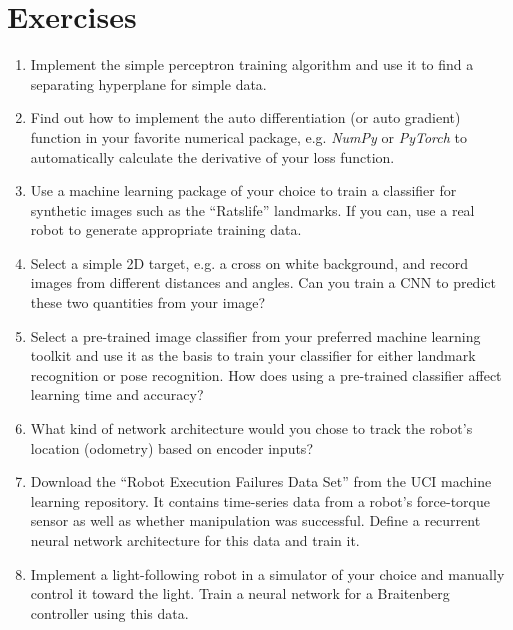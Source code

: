 \section*{Exercises}\small
\begin{enumerate}
\item Implement the simple perceptron training algorithm and use it to find a separating hyperplane for simple data.
\item Find out how to implement the auto differentiation (or auto gradient) function in your favorite numerical package, e.g. \textsl{NumPy} or \textsl{PyTorch} to automatically calculate the derivative of your loss function.
\item Use a machine learning package of your choice to train a classifier for synthetic images such as the ``Ratslife'' landmarks. If you can, use a real robot to generate appropriate training data.
\item Select a simple 2D target, e.g. a cross on white background, and record images from different distances and angles. Can you train a CNN to predict these two quantities from your image?
\item Select a pre-trained image classifier from your preferred machine learning toolkit and use it as the basis to train your classifier for either landmark recognition or pose recognition. How does using a pre-trained classifier affect learning time and accuracy?
\item What kind of network architecture would you chose to track the robot's location (odometry) based on encoder inputs?
\item Download the ``Robot Execution Failures Data Set'' from the UCI machine learning repository. It contains time-series data from a robot's force-torque sensor as well as whether manipulation was successful. Define a recurrent neural network architecture for this data and train it.
\item Implement a light-following robot in a simulator of your choice and manually control it toward the light. Train a neural network for a Braitenberg controller using this data.

\end{enumerate}\normalsize


